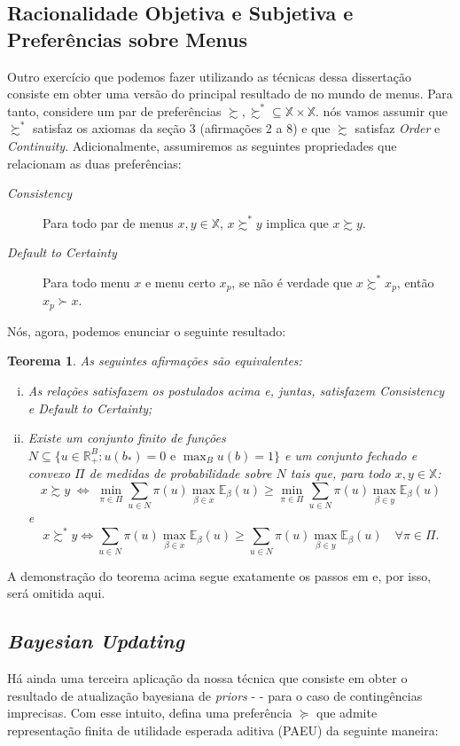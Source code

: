 \documentclass[11pt, a4paper]{article}
\theoremstyle{nonumberplain}
\theoremstyle{plain}
\newtheorem{theorem}{Teorema}
\theoremstyle{plain}
\theoremstyle{plain}
\theoremstyle{nonumberplain}
\begin{document}
\subsection{Racionalidade Objetiva e Subjetiva e Preferências sobre Menus}
Outro exercício que podemos fazer utilizando as técnicas dessa dissertação consiste em obter uma versão do principal resultado de \cite{Gilboa2010} no mundo de menus. Para tanto, considere um par de preferências $\succsim, \succsim^*\subseteq\mathbb{X}\times\mathbb{X}$. nós vamos assumir que $\succsim^*$ satisfaz os axiomas da seção 3 (afirmações 2 a 8) e que $\succsim$ satisfaz \emph{Order} e \emph{Continuity}. Adicionalmente, assumiremos as seguintes propriedades que relacionam as duas preferências:
\begin{description}
\item [\textit{Consistency}] Para todo par de menus $x,y\in\mathbb{X}$, $x\succsim^*y$ implica que $x\succsim y$.
\item[\textit{Default to Certainty}] Para todo menu $x$ e menu certo $x_p$, se não é verdade que $x\succsim^* x_p$, então $x_p \succ x$.
\end{description}
Nós, agora, podemos enunciar o seguinte resultado:\\
\begin{theorem}
As seguintes afirmações são equivalentes:
\begin{enumerate}[(i)]
\item As relações satisfazem os postulados acima e, juntas, satisfazem \emph{Consistency} e \emph{Default to Certainty};
\item Existe um conjunto finito de funções $N\subseteq\{u \in \mathbb{R}^B_+:u(b_*)=0\text { e }\max_{B}u(b)=1\}$ e um conjunto fechado e convexo $\Pi$ de medidas de probabilidade sobre $N$ tais que, para todo $x,y\in\mathbb{X}$:
\[x \succsim y \;\Leftrightarrow\; \min_{\pi\in\Pi}\sum_{u\in N} \pi(u)\max_{\beta\in x}\mathbb{E}_\beta(u)\geq \min_{\pi\in\Pi}\sum_{u\in N} \pi(u)\max_{\beta\in y}\mathbb{E}_\beta(u)\]
e
$$x\succsim^* y \Leftrightarrow \sum_{u\in N} \pi(u)\max_{\beta\in x}\mathbb{E}_\beta(u) \geq \sum_{u\in N} \pi(u)\max_{\beta\in y}\mathbb{E}_\beta(u)\quad \forall\pi\in\Pi.$$
\end{enumerate}
\end{theorem}
\noindent
A demonstração do teorema acima segue exatamente os passos em \cite{Gilboa2010} e, por isso, será omitida aqui.

\subsection{\emph{Bayesian Updating}}
Há ainda uma terceira aplicação da nossa técnica que consiste em obter o resultado de atualização bayesiana de \emph{priors} - \cite{Riella2013a} - para o caso de contingências imprecisas. Com esse intuito, defina uma preferência $\succcurlyeq$ que admite representação finita de utilidade esperada aditiva (PAEU) da seguinte maneira:
\end{document}

